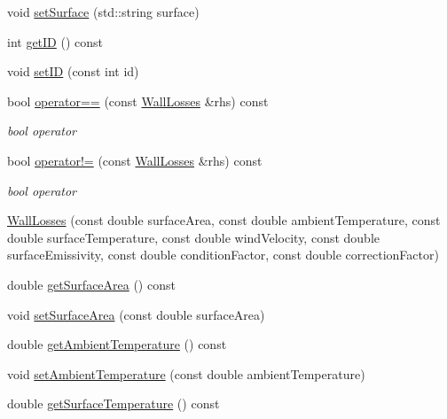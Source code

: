 \begin{DoxyCompactItemize}
void \hyperlink{class_wall_losses_af329a27b78e1f2d84af6a48ffc59bfad}{set\+Surface} (std\+::string surface)
\item 
int \hyperlink{class_wall_losses_ae764fa8917879d8c24df7582c159fec6}{get\+ID} () const
\item 
void \hyperlink{class_wall_losses_a3a135d9bfd6c6f1c4742031ab568b26d}{set\+ID} (const int id)
\item 
\mbox{\label{class_wall_losses_ad9eebb34927690332c00df51507878e9}} 
bool \hyperlink{class_wall_losses_ad9eebb34927690332c00df51507878e9}{operator==} (const \hyperlink{class_wall_losses}{Wall\+Losses} \&rhs) const
\begin{DoxyCompactList}\small\item\em bool operator \end{DoxyCompactList}\item 
\mbox{\label{class_wall_losses_a46d50205e67870978292c4bfa1c9d329}} 
bool \hyperlink{class_wall_losses_a46d50205e67870978292c4bfa1c9d329}{operator!=} (const \hyperlink{class_wall_losses}{Wall\+Losses} \&rhs) const
\begin{DoxyCompactList}\small\item\em bool operator \end{DoxyCompactList}\item 
\hyperlink{class_wall_losses_a7d46f259c632ecdcde5ae31468c03e2e}{Wall\+Losses} (const double surface\+Area, const double ambient\+Temperature, const double surface\+Temperature, const double wind\+Velocity, const double surface\+Emissivity, const double condition\+Factor, const double correction\+Factor)
\item 
double \hyperlink{class_wall_losses_ad4d3aa549cc7ab19e927823dbafed973}{get\+Surface\+Area} () const
\item 
void \hyperlink{class_wall_losses_acbbbe4b1ec44bb04e5e1db944017995c}{set\+Surface\+Area} (const double surface\+Area)
\item 
double \hyperlink{class_wall_losses_a806cb5860fe78d0379e3877f043655ad}{get\+Ambient\+Temperature} () const
\item 
void \hyperlink{class_wall_losses_a08a8f4c9add0ce78733be4558cc8410b}{set\+Ambient\+Temperature} (const double ambient\+Temperature)
\item 
double \hyperlink{class_wall_losses_ac2ce3cea6eef435a5fcf6a659b8e7d70}{get\+Surface\+Temperature} () const
\item 

\end{DoxyCompactItemize}
